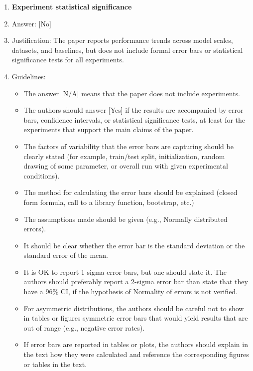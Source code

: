 \documentclass{llmxive}
\providecommand{\answerYes}[1][]{[Yes]#1}
\providecommand{\answerNo}[1][]{[No]#1}
\providecommand{\answerNA}[1][]{[N/A]#1}
\begin{document}
\begin{enumerate}
\item {\bf Experiment statistical significance}
    \item[] Answer: \answerNo{}
    \item[] Justification: The paper reports performance trends across model scales, datasets, and baselines, but does not include formal error bars or statistical significance tests for all experiments.
    \item[] Guidelines:
    \begin{itemize}
        \item The answer \answerNA{} means that the paper does not include experiments.
        \item The authors should answer \answerYes{} if the results are accompanied by error bars, confidence intervals, or statistical significance tests, at least for the experiments that support the main claims of the paper.
        \item The factors of variability that the error bars are capturing should be clearly stated (for example, train/test split, initialization, random drawing of some parameter, or overall run with given experimental conditions).
        \item The method for calculating the error bars should be explained (closed form formula, call to a library function, bootstrap, etc.)
        \item The assumptions made should be given (e.g., Normally distributed errors).
        \item It should be clear whether the error bar is the standard deviation or the standard error of the mean.
        \item It is OK to report 1-sigma error bars, but one should state it. The authors should preferably report a 2-sigma error bar than state that they have a 96\% CI, if the hypothesis of Normality of errors is not verified.
        \item For asymmetric distributions, the authors should be careful not to show in tables or figures symmetric error bars that would yield results that are out of range (e.g., negative error rates).
        \item If error bars are reported in tables or plots, the authors should explain in the text how they were calculated and reference the corresponding figures or tables in the text.
    \end{itemize}


\end{enumerate}
\end{document}
